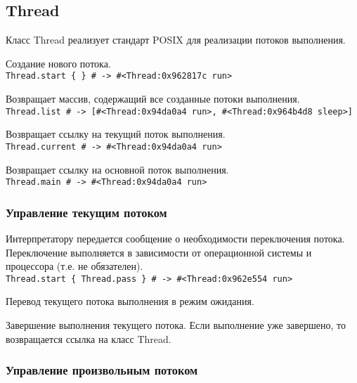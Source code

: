 \subsection{Thread}

Класс Thread реализует стандарт POSIX для реализации потоков выполнения.

\begin{methodlist}
  Создание нового потока.
  \\\verb!Thread.start { } # -> #<Thread:0x962817c run>!

  Возвращает массив, содержащий все созданные потоки выполнения. 
  \\\verb!Thread.list # -> [#<Thread:0x94da0a4 run>, #<Thread:0x964b4d8 sleep>]!

  Возвращает ссылку на текущий поток выполнения. 
  \\\verb!Thread.current # -> #<Thread:0x94da0a4 run>!
 
  Возвращает ссылку на основной поток выполнения. 
  \\\verb!Thread.main # -> #<Thread:0x94da0a4 run>!
\end{methodlist}

\subsubsection*{Управление текущим потоком}

\begin{methodlist}
  Интерпретатору передается сообщение о необходимости переключения потока. Переключение выполняется в зависимости от операционной системы и процессора (т.е. не обязателен). 
  \\\verb!Thread.start { Thread.pass } # -> #<Thread:0x962e554 run>!

  Перевод текущего потока выполнения в режим ожидания.

  Завершение выполнения текущего потока. Если выполнение уже завершено, то возвращается ссылка на класс Thread.
\end{methodlist}

\subsubsection*{Управление произвольным потоком}


